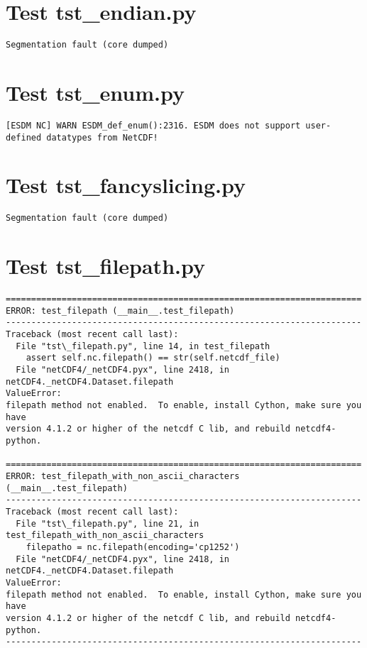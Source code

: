 \section{Test tst\_endian.py}

\begin{verbatim}
Segmentation fault (core dumped)
\end{verbatim}

\section{Test tst\_enum.py}

\begin{verbatim}
[ESDM NC] WARN ESDM_def_enum():2316. ESDM does not support user-defined datatypes from NetCDF!
\end{verbatim}

\section{Test tst\_fancyslicing.py}

\begin{verbatim}
Segmentation fault (core dumped)
\end{verbatim}

\section{Test tst\_filepath.py}

\begin{verbatim}
======================================================================
ERROR: test_filepath (__main__.test_filepath)
----------------------------------------------------------------------
Traceback (most recent call last):
  File "tst\_filepath.py", line 14, in test_filepath
    assert self.nc.filepath() == str(self.netcdf_file)
  File "netCDF4/_netCDF4.pyx", line 2418, in netCDF4._netCDF4.Dataset.filepath
ValueError:
filepath method not enabled.  To enable, install Cython, make sure you have
version 4.1.2 or higher of the netcdf C lib, and rebuild netcdf4-python.

======================================================================
ERROR: test_filepath_with_non_ascii_characters (__main__.test_filepath)
----------------------------------------------------------------------
Traceback (most recent call last):
  File "tst\_filepath.py", line 21, in test_filepath_with_non_ascii_characters
    filepatho = nc.filepath(encoding='cp1252')
  File "netCDF4/_netCDF4.pyx", line 2418, in netCDF4._netCDF4.Dataset.filepath
ValueError:
filepath method not enabled.  To enable, install Cython, make sure you have
version 4.1.2 or higher of the netcdf C lib, and rebuild netcdf4-python.
----------------------------------------------------------------------

\end{verbatim}

